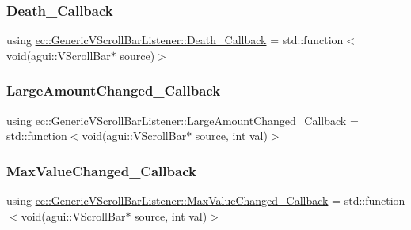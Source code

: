 \subsubsection{\texorpdfstring{Death\+\_\+\+Callback}{Death\_Callback}}
{\footnotesize\ttfamily using \mbox{\hyperlink{classec_1_1_generic_v_scroll_bar_listener_a821b55a49a6b6324b98a66872b19a823}{ec\+::\+Generic\+V\+Scroll\+Bar\+Listener\+::\+Death\+\_\+\+Callback}} =  std\+::function$<$void(agui\+::\+V\+Scroll\+Bar$\ast$ source)$>$}

\mbox{\label{classec_1_1_generic_v_scroll_bar_listener_ad3ca6f0d2092abe22a26f20e821c35b6}} 
\subsubsection{\texorpdfstring{Large\+Amount\+Changed\+\_\+\+Callback}{LargeAmountChanged\_Callback}}
{\footnotesize\ttfamily using \mbox{\hyperlink{classec_1_1_generic_v_scroll_bar_listener_ad3ca6f0d2092abe22a26f20e821c35b6}{ec\+::\+Generic\+V\+Scroll\+Bar\+Listener\+::\+Large\+Amount\+Changed\+\_\+\+Callback}} =  std\+::function$<$void(agui\+::\+V\+Scroll\+Bar$\ast$ source, int val)$>$}

\mbox{\label{classec_1_1_generic_v_scroll_bar_listener_a21e91025da3eebfc5da4b7489869183a}} 
\subsubsection{\texorpdfstring{Max\+Value\+Changed\+\_\+\+Callback}{MaxValueChanged\_Callback}}
{\footnotesize\ttfamily using \mbox{\hyperlink{classec_1_1_generic_v_scroll_bar_listener_a21e91025da3eebfc5da4b7489869183a}{ec\+::\+Generic\+V\+Scroll\+Bar\+Listener\+::\+Max\+Value\+Changed\+\_\+\+Callback}} =  std\+::function$<$void(agui\+::\+V\+Scroll\+Bar$\ast$ source, int val)$>$}

